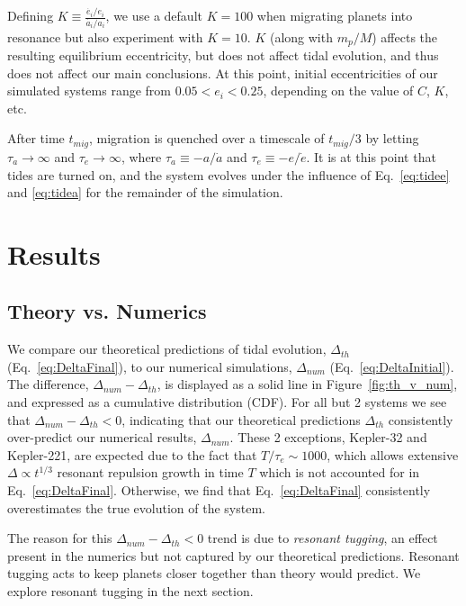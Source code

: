 Defining $K \equiv \frac{\dot{e_i}/e_i}{\dot{a_i}/a_i}$, we use a default $K = 100$ when migrating planets into resonance but also experiment with $K = 10$. 
$K$ (along with $m_p/M$) affects the resulting equilibrium eccentricity, but does not affect tidal evolution, and thus does not affect our main conclusions. 
At this point, initial eccentricities of our simulated \kep{} systems range from $0.05 < e_i < 0.25$, depending on the value of $C$, $K$, etc.

After time $t_{mig}$, migration is quenched over a timescale of $t_{mig}/3$ by letting $\tau_a \rightarrow \infty$ and $\tau_e \rightarrow \infty$, where $\tau_a \equiv - a/\dot{a}$ and $\tau_e \equiv - e/\dot{e}$.
It is at this point that tides are turned on, and the system evolves under the influence of Eq.~\ref{eq:tidee} and \ref{eq:tidea} for the remainder of the simulation. 

\section{Results}
\label{sec:results}
\subsection{Theory vs. Numerics}
\label{sec:th_v_num}
We compare our theoretical predictions of tidal evolution, $\Delta_{th}$ (Eq.~\ref{eq:DeltaFinal}), to our numerical simulations, $\Delta_{num}$ (Eq.~\ref{eq:DeltaInitial}). 
The difference, $\Delta_{num} - \Delta_{th}$, is displayed as a solid line in Figure~\ref{fig:th_v_num}, and expressed as a cumulative distribution (CDF).
For all but 2 systems we see that $\Delta_{num} - \Delta_{th} < 0$, indicating that our theoretical predictions $\Delta_{th}$ consistently over-predict our numerical results, $\Delta_{num}$. 
These 2 exceptions, Kepler-32 and Kepler-221, are expected due to the fact that $T/\tau_e \sim 1000$, which allows extensive $\Delta \propto t^{1/3}$ resonant repulsion growth \citep{LithwickWu2012} in time $T$ which is not accounted for in Eq.~\ref{eq:DeltaFinal}.
Otherwise, we find that Eq.~\ref{eq:DeltaFinal} consistently overestimates the true evolution of the system.


The reason for this $\Delta_{num} - \Delta_{th} < 0$ trend is due to \textit{resonant tugging}, an effect present in the numerics but not captured by our theoretical predictions.
Resonant tugging acts to keep planets closer together than theory would predict. We explore resonant tugging in the next section. 

